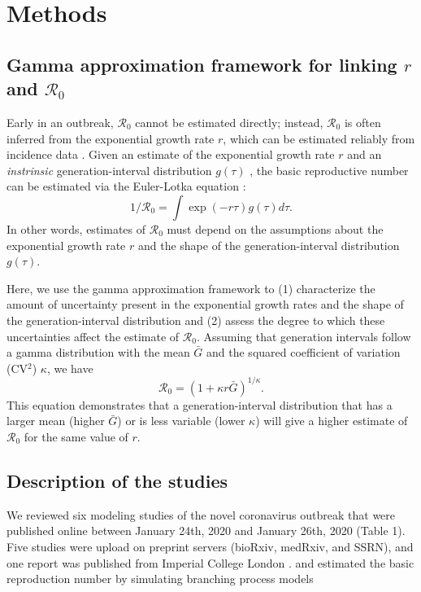 \documentclass[12pt]{article}
\newcommand{\Rx}[1]{\ensuremath{{\mathcal R}_{#1}}}
\newcommand{\Ro}{\Rx{0}\xspace}
\begin{document}
\section{Methods}

\subsection{Gamma approximation framework for linking $r$ and $\mathcal R_0$}

Early in an outbreak, \Ro cannot be estimated directly;
instead, \Ro is often inferred from the exponential growth rate $r$, which can be estimated reliably from incidence data \citep{mills2004transmissibility, nishiura2009transmission, ma2014estimating}.
Given an estimate of the exponential growth rate $r$ and an \emph{instrinsic} generation-interval distribution $g(\tau)$ \citep{champredon2015intrinsic}, the basic reproductive
number can be estimated via the Euler-Lotka equation \citep{wallinga2007generation}:
\begin{equation}
1/\mathcal R_0 = \int \exp(-r\tau) g(\tau) d\tau.
\end{equation}
In other words, estimates of \Ro must
depend on the assumptions about the
exponential growth rate $r$ and the shape of the generation-interval distribution $g(\tau)$.

Here, we use the gamma approximation framework \citep{mcbryde2009early, nishiura2009transmission, roberts2011early, park2019practical} to (1) characterize the amount of uncertainty present in the exponential growth rates and the shape of the generation-interval distribution and (2) assess the degree to which these uncertainties affect the estimate of \Ro.
Assuming that generation intervals follow a gamma distribution
with the mean $\bar G$ and the squared coefficient of variation (CV$^2$) $\kappa$, 
we have
\begin{equation}
\mathcal R_0 = \left(1 + \kappa r \bar{G}\right)^{1/\kappa}.
\label{eq:gamma}
\end{equation}
This equation demonstrates that a generation-interval distribution
that has a larger mean (higher $\bar{G}$) or is less variable (lower $\kappa$)
will give a higher estimate of \Ro for the same value of $r$.

\subsection{Description of the studies}

We reviewed six modeling studies of the novel coronavirus outbreak that were published online between January 24th, 2020 and January 26th, 2020 (Table 1).
Five studies \citep{liuncov, majumderncov, readncov, riouncov, zhaoncov} were upload on preprint servers (bioRxiv, medRxiv, and SSRN), and one report was published from Imperial College London \citep{imaincov}.
\cite{imaincov} and \cite{rioucov} estimated the basic reproduction number by simulating branching process models 
\end{document}
